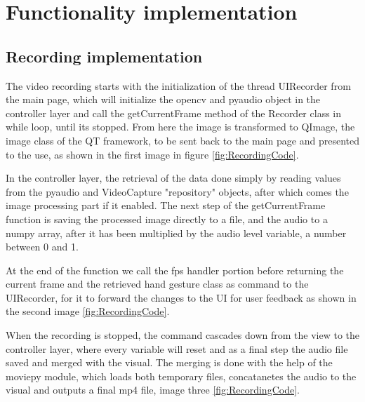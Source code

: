 \section{Functionality implementation}
\label{sec:designsec5}

\subsection{Recording implementation}
\label{sec:designsec5subsec1}

\par The video recording starts with the initialization of the thread UIRecorder from the main page, which will initialize the opencv and pyaudio object in the controller layer and call the getCurrentFrame method of the Recorder class in while loop, until its stopped. From here the image is transformed to QImage, the image class of the QT framework, to be sent back to the main page and presented to the use, as shown in the first image in figure \ref{fig:RecordingCode}.
\par In the controller layer, the retrieval of the data done simply by reading values from the pyaudio and VideoCapture "repository" objects, after which comes the image processing part if it enabled. The next step of the getCurrentFrame function is saving the processed image directly to a file, and the audio to a numpy array, after it has been multiplied by the audio level variable, a number between 0 and 1.
\par At the end of the function we call the fps handler portion before returning the current frame and the retrieved hand gesture class as command to the UIRecorder, for it to forward the changes to the UI for user feedback as shown in the second image \ref{fig:RecordingCode}.
\par When the recording is stopped, the command cascades down from the view to the controller layer, where every variable will reset and as a final step the audio file saved and merged with the visual. The merging is done with the help of the moviepy module, which loads both temporary files, concatanetes the audio to the visual and outputs a final mp4 file, image three \ref{fig:RecordingCode}.


